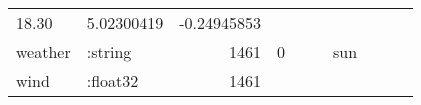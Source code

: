 \documentclass[]{article}
\begin{document}
\begin{longtable}[]{@{}llrrllllrr@{}}
\begin{minipage}[t]{0.07\columnwidth}
18.30\strut
\end{minipage} & \begin{minipage}[t]{0.11\columnwidth}\raggedleft\strut
5.02300419\strut
\end{minipage} & \begin{minipage}[t]{0.07\columnwidth}\raggedleft\strut
-0.24945853\strut
\end{minipage}\tabularnewline
\begin{minipage}[t]{0.08\columnwidth}\raggedright\strut
weather\strut
\end{minipage} & \begin{minipage}[t]{0.11\columnwidth}\raggedright\strut
:string\strut
\end{minipage} & \begin{minipage}[t]{0.06\columnwidth}\raggedleft\strut
1461\strut
\end{minipage} & \begin{minipage}[t]{0.07\columnwidth}\raggedleft\strut
0\strut
\end{minipage} & \begin{minipage}[t]{0.07\columnwidth}\raggedright\strut
\strut
\end{minipage} & \begin{minipage}[t]{0.07\columnwidth}\raggedright\strut
\strut
\end{minipage} & \begin{minipage}[t]{0.04\columnwidth}\raggedright\strut
sun\strut
\end{minipage} & \begin{minipage}[t]{0.07\columnwidth}\raggedright\strut
\strut
\end{minipage} & \begin{minipage}[t]{0.11\columnwidth}\raggedleft\strut
\strut
\end{minipage} & \begin{minipage}[t]{0.07\columnwidth}\raggedleft\strut
\strut
\end{minipage}\tabularnewline
\begin{minipage}[t]{0.08\columnwidth}\raggedright\strut
wind\strut
\end{minipage} & \begin{minipage}[t]{0.11\columnwidth}\raggedright\strut
:float32\strut
\end{minipage} & \begin{minipage}[t]{0.06\columnwidth}\raggedleft\strut
1461\strut
\end{minipage} & \begin{minipage}[t]{0.07\columnwidth}\raggedleft\strut

\end{minipage}
\end{longtable}
\end{document}
